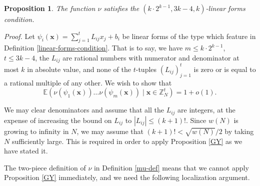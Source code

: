 \documentclass[12pt,a4paper,reqno]{amsart}
\numberwithin{equation}{section}
\theoremstyle{plain}
\newtheorem{proposition}[subsection]{Proposition}
\theoremstyle{definition}
\renewcommand{\leq}{\leqslant}
\def\w{w}
\def\vs{\vspace{11pt}}
\def\ni{\noindent}
\def\proof{\noindent\textit{Proof. }}
\begin{document}
\begin{proposition}\label{mu-linear-forms}
The function $\nu$ satisfies the $(k \cdot 2^{k-1},3k-4,k)$-linear forms condition.
\end{proposition}
\proof 
Let $\psi_i(\mathbf{x}) = \sum_{j = 1}^t L_{ij} x_j + b_i$ be linear forms of the type which feature in Definition \ref{linear-forms-condition}. That is to say, we have $m \leq k \cdot 2^{k-1}$, $t \leq 3k - 4$, the $L_{ij}$ are rational numbers with numerator and denominator at most $k$ in absolute value, and none of the $t$-tuples $(L_{ij})_{j=1}^t$ is zero or is equal to a rational multiple of any other.
We wish to show that
\begin{equation}\label{to-prove} \mathbb{E}(\nu(\psi_1(\mathbf{x})) \dots \nu(\psi_m(\mathbf{x})) \; | \; \mathbf{x} \in \mathbb{Z}_N^t) = 1 + o(1).\end{equation}

\ni We may clear denominators and assume that all the $L_{ij}$ are integers, at the expense of increasing the bound on $L_{ij}$ to
$|L_{ij}| \leq (k+1)!$.  Since $\w(N)$ is growing to infinity in $N$, we may assume that 
$(k+1)! < \sqrt{\w(N)}/2$ by taking $N$ sufficiently large. This is required in order to apply Proposition \ref{GY} as we have stated it. \vs

\ni The two-piece definition of $\nu$ in Definition \ref{mu-def} means that we cannot apply Proposition \ref{GY} immediately, and we need the following localization argument. \vs
\end{document}
